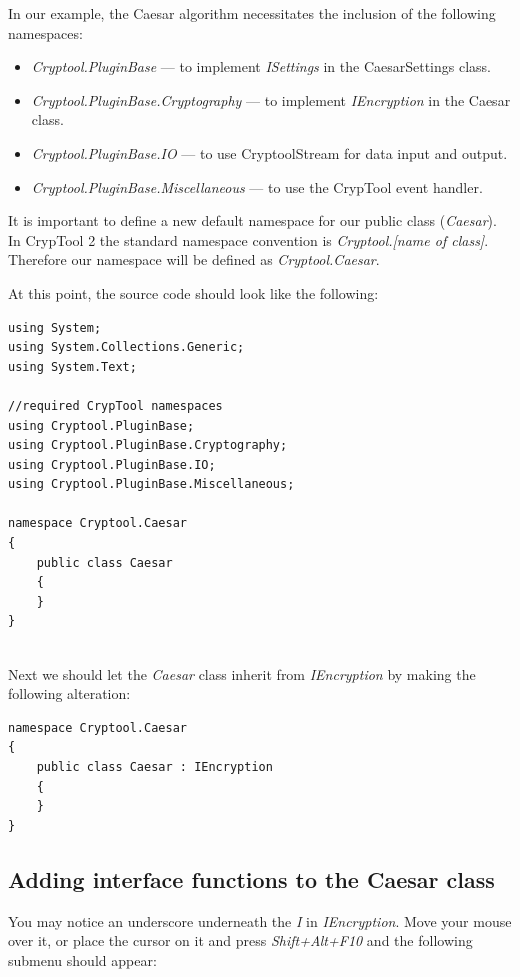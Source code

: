 \noindent In our example, the Caesar algorithm necessitates the inclusion of the following namespaces:

\begin{itemize}
	\item \textit{Cryptool.PluginBase} --- to implement \textit{ISettings} in the CaesarSettings class.
	\item \textit{Cryptool.PluginBase.Cryptography} --- to implement \textit{IEncryption} in the Caesar class.
	\item \textit{Cryptool.PluginBase.IO} --- to use CryptoolStream for data input and output.
	\item \textit{Cryptool.PluginBase.Miscellaneous} --- to use the CrypTool event handler.
\end{itemize}

\noindent It is important to define a new default namespace for our public class (\textit{Caesar}). In CrypTool 2  the standard namespace convention is \textit{Cryptool.[name of class]}. Therefore our namespace will be defined as \textit{Cryptool.Caesar}.\clearpage

\noindent At this point, the source code should look like the following:

\begin{lstlisting}
using System;
using System.Collections.Generic;
using System.Text;

//required CrypTool namespaces
using Cryptool.PluginBase;
using Cryptool.PluginBase.Cryptography;
using Cryptool.PluginBase.IO;
using Cryptool.PluginBase.Miscellaneous;

namespace Cryptool.Caesar
{
	public class Caesar
	{
	}
}
\end{lstlisting}

\ \\ %
\noindent Next we should let the \textit{Caesar} class inherit from \textit{IEncryption} by making the following alteration:

\begin{lstlisting}
namespace Cryptool.Caesar
{
	public class Caesar : IEncryption
	{
	}
}
\end{lstlisting}

\subsection{Adding interface functions to the Caesar class}
\label{sec:AddingInterfaceFunctionsToTheCaesarClass}

You may notice an underscore underneath the \textit{I} in \textit{IEncryption}. Move your mouse over it, or place the cursor on it and press \textit{Shift+Alt+F10} and the following submenu should appear:

